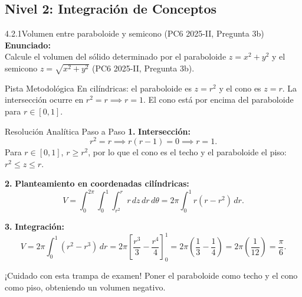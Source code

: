 \documentclass[11pt,a4paper]{article}
\begin{document}
\subsection{Nivel 2: Integración de Conceptos}

\begin{nivelbox}{4.2.1}{Volumen entre paraboloide y semicono (PC6 2025-II, Pregunta 3b)}
\textbf{Enunciado:}\\
Calcule el volumen del sólido determinado por el paraboloide $z = x^2 + y^2$ y el semicono $z = \sqrt{x^2 + y^2}$ (PC6 2025-II, Pregunta 3b).

\begin{observacionbox}{Pista Metodológica}
En cilíndricas: el paraboloide es $z = r^2$ y el cono es $z = r$. La intersección ocurre en $r^2 = r \implies r = 1$. El cono está por encima del paraboloide para $r \in [0, 1]$.
\end{observacionbox}

\begin{ejerciciobox}{Resolución Analítica Paso a Paso}
\smallskip\noindent\textbf{1.} \textbf{Intersección:}
\[r^2 = r \implies r(r - 1) = 0 \implies r = 1.\]
Para $r \in [0, 1]$, $r \ge r^2$, por lo que el cono es el techo y el paraboloide el piso: $r^2 \le z \le r$.

\smallskip\noindent\textbf{2.} \textbf{Planteamiento en coordenadas cilíndricas:}
\[V = \int_0^{2\pi} \int_0^1 \int_{r^2}^r r \, dz \, dr \, d\theta = 2\pi \int_0^1 r (r - r^2) \, dr.\]

\smallskip\noindent\textbf{3.} \textbf{Integración:}
\[V = 2\pi \int_0^1 (r^2 - r^3) \, dr = 2\pi \left[ \frac{r^3}{3} - \frac{r^4}{4} \right]_0^1 = 2\pi \left( \frac{1}{3} - \frac{1}{4} \right) = 2\pi \left( \frac{1}{12} \right) = \frac{\pi}{6}.\]
\end{ejerciciobox}

\begin{errorbox}{¡Cuidado con esta trampa de examen!}
Poner el paraboloide como techo y el cono como piso, obteniendo un volumen negativo.
\end{errorbox}
\end{nivelbox}
\bigskip
\end{document}
